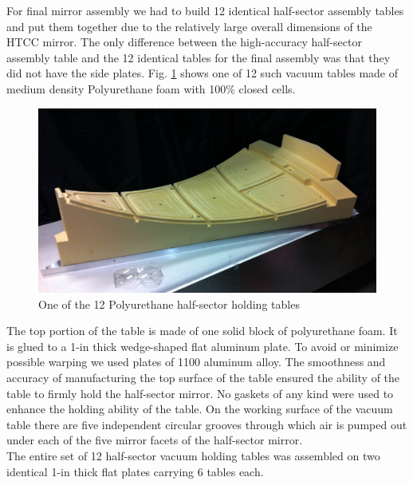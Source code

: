 \indent For final mirror assembly we had to build 12 identical half-sector assembly tables and put them together due to the relatively large overall dimensions of the HTCC mirror. The only difference between the high-accuracy half-sector assembly table and the 12 identical tables for the final assembly was that they did not have the side plates. Fig. \ref{fig:One_Foam_Vacuum_Table} shows one of 12 such vacuum tables made of medium density Polyurethane foam with 100\% closed cells.
 
\begin{figure}[ht]
    \centering
    \includegraphics[width=1.0\linewidth]{images/One_Foam_Vacuum_Table.jpg}
    \caption{One of the 12 Polyurethane half-sector holding tables}
    \label{fig:One_Foam_Vacuum_Table}
\end{figure}
 
\indent The top portion of the table is made of one solid block of polyurethane foam. It is glued to a 1-in thick wedge-shaped flat aluminum plate. To avoid or minimize possible warping we used plates of 1100 aluminum alloy. The smoothness and accuracy of manufacturing the top surface of the table ensured the ability of the table to firmly hold the half-sector mirror. No gaskets of any kind were used to enhance the holding ability of the table. On the working surface of the vacuum table there are five independent circular grooves through which air is pumped out under each of the five mirror facets of the half-sector mirror.
\\
\indent The entire set of 12 half-sector vacuum holding tables was assembled on two identical 1-in thick flat plates carrying 6 tables each. 

